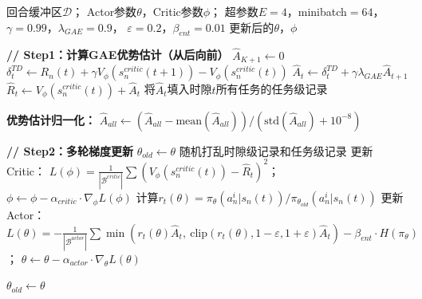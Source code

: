 \documentclass[a4paper,11pt]{article}
\begin{document}


\begin{algorithm}[t]
\caption{MAPPO网络参数更新（训练层）}
\label{alg:training}
\begin{algorithmic}[1]
\REQUIRE 回合缓冲区$\mathcal{D}$；
         Actor参数$\theta$，Critic参数$\phi$；
         超参数$E=4$，minibatch$=64$，
         $\gamma=0.99$，$\lambda_{GAE}=0.9$，
         $\varepsilon=0.2$，$\beta_{ent}=0.01$
\ENSURE 更新后的$\theta$，$\phi$

\STATE \textbf{// Step1：计算GAE优势估计（从后向前）}
    \STATE $\hat{A}_{K+1} \leftarrow 0$
        \STATE $\delta^{TD}_t \leftarrow R_n(t)
               + \gamma V_\phi(s^{critic}_n(t+1))
               - V_\phi(s^{critic}_n(t))$
        \STATE $\hat{A}_t \leftarrow \delta^{TD}_t
               + \gamma\lambda_{GAE}\hat{A}_{t+1}$
        \STATE $\hat{R}_t \leftarrow V_\phi(s^{critic}_n(t))
               + \hat{A}_t$
        \STATE 将$\hat{A}_t$填入时隙$t$所有任务的任务级记录
    \ENDFOR
\ENDFOR

\STATE \textbf{优势估计归一化：}
\STATE $\hat{A}_{all} \leftarrow
       (\hat{A}_{all} - \text{mean}(\hat{A}_{all}))
       / (\text{std}(\hat{A}_{all}) + 10^{-8})$

\STATE \textbf{// Step2：多轮梯度更新}
\STATE $\theta_{old} \leftarrow \theta$
    \STATE 随机打乱时隙级记录和任务级记录
        \STATE 更新Critic：
               $L(\phi) = \frac{1}{|\mathcal{B}^{critic}|}
               \sum(V_\phi(s^{critic}_n(t)) - \hat{R}_t)^2$；
               $\phi \leftarrow \phi - \alpha_{critic}\cdot\nabla_\phi L(\phi)$
        \STATE 计算$r_t(\theta) =
               \pi_\theta(a^i_n|s_n(t))
               / \pi_{\theta_{old}}(a^i_n|s_n(t))$
        \STATE 更新Actor：
               $L(\theta) = -\frac{1}{|\mathcal{B}^{actor}|}
               \sum\min(r_t(\theta)\hat{A}_t,\
               \text{clip}(r_t(\theta),
               1-\varepsilon, 1+\varepsilon)\hat{A}_t)
               - \beta_{ent}\cdot H(\pi_\theta)$；
               $\theta \leftarrow \theta - \alpha_{actor}\cdot\nabla_\theta L(\theta)$
    \ENDFOR
\ENDFOR

\STATE $\theta_{old} \leftarrow \theta$
\end{algorithmic}
\end{algorithm}
\end{document}
